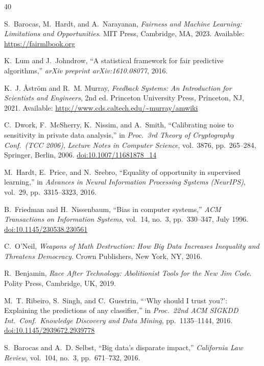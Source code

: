 \documentclass[12pt,a4paper]{article}
\newcommand{\doi}[1]{\href{https://doi.org/#1}{doi:#1}}
\theoremstyle{definition}
\theoremstyle{remark}
\begin{document}

\begin{thebibliography}{40}

S.~Barocas, M.~Hardt, and A.~Narayanan,
\emph{Fairness and Machine Learning: Limitations and Opportunities}.
MIT Press, Cambridge, MA, 2023.
Available: \url{https://fairmlbook.org}

K.~Lum and J.~Johndrow,
``A statistical framework for fair predictive algorithms,''
\emph{arXiv preprint arXiv:1610.08077}, 2016.

K.~J. {\AA}str{\"o}m and R.~M. Murray,
\emph{Feedback Systems: An Introduction for Scientists and Engineers}, 2nd ed.
Princeton University Press, Princeton, NJ, 2021.
Available: \url{http://www.cds.caltech.edu/~murray/amwiki}

C.~Dwork, F.~McSherry, K.~Nissim, and A.~Smith,
``Calibrating noise to sensitivity in private data analysis,''
in \emph{Proc.\ 3rd Theory of Cryptography Conf.\ (TCC 2006)},
\emph{Lecture Notes in Computer Science}, vol.~3876, pp.~265--284,
Springer, Berlin, 2006.
\doi{10.1007/11681878\_14}

M.~Hardt, E.~Price, and N.~Srebro,
``Equality of opportunity in supervised learning,''
in \emph{Advances in Neural Information Processing Systems (NeurIPS)},
vol.~29, pp.~3315--3323, 2016.

B.~Friedman and H.~Nissenbaum,
``Bias in computer systems,''
\emph{ACM Transactions on Information Systems}, vol.~14, no.~3,
pp.~330--347, July 1996.
\doi{10.1145/230538.230561}

C.~O'Neil,
\emph{Weapons of Math Destruction: How Big Data Increases Inequality and
Threatens Democracy}.
Crown Publishers, New York, NY, 2016.

R.~Benjamin,
\emph{Race After Technology: Abolitionist Tools for the New Jim Code}.
Polity Press, Cambridge, UK, 2019.

M.~T. Ribeiro, S.~Singh, and C.~Guestrin,
```Why should I trust you?': Explaining the predictions of any classifier,''
in \emph{Proc.\ 22nd ACM SIGKDD Int.\ Conf.\ Knowledge Discovery and Data Mining},
pp.~1135--1144, 2016.
\doi{10.1145/2939672.2939778}

S.~Barocas and A.~D. Selbst,
``Big data's disparate impact,''
\emph{California Law Review}, vol.~104, no.~3, pp.~671--732, 2016.


\end{thebibliography}
\end{document}
